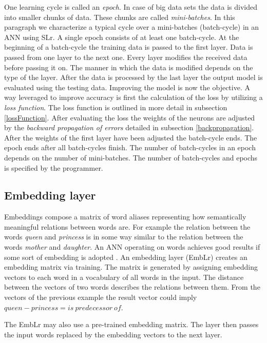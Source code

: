 One learning cycle is called an \textit{epoch}. In case of big data sets the data is divided into smaller chunks of data. These chunks are called \textit{mini-batches}. In this paragraph we characterize a typical cycle over a mini-batches (batch-cycle) in an ANN using SLr. A single epoch consists of at least one batch-cycle. At the beginning of a batch-cycle the training data is passed to the first layer. Data is passed from one layer to the next one. Every layer modifies the received data before passing it on. The manner in which the data is modified depends on the type of the layer. After the data is processed by the last layer the output model is evaluated using the testing data. Improving the model is now the objective. A way leveraged to improve accuracy is first the calculation of the loss by utilizing a \textit{loss function}. The loss function is outlined in more detail in subsection \ref{lossFunction}. After evaluating the loss the weights of the neurons are adjusted by the \textit{backward propagation of errors} detailed in subsection \ref{backpropagation}. After the weights of the first layer have been adjusted the batch-cycle ends. The epoch ends after all batch-cycles finish. The number of batch-cycles in an epoch depends on the number of mini-batches. The number of batch-cycles and epochs is specified by the programmer. 

\subsection{Embedding layer}\label{embeddingLayers}
Embeddings \cite{embeddingsOverview} compose a matrix of word aliases representing how semantically meaningful relations between words are. For example the relation between the words \textit{queen} and \textit{princess} is in some way similar to the relation between the words \textit{mother} and \textit{daughter}. An ANN operating on words achieves good results if some sort of embedding is adopted \cite{goodToUseEmbeddings}. An embedding layer (EmbLr) creates an embedding matrix via training. The matrix is generated by assigning embedding vectors to each word in a vocabulary of all words in the input. The distance between the vectors of two words describes the relations between them. From the vectors of the previous example the result vector could imply $queen - princess = is~predecessor~of$. 

The EmbLr may also use a pre-trained embedding matrix. The layer then passes the input words replaced by the embedding vectors to the next layer. 

